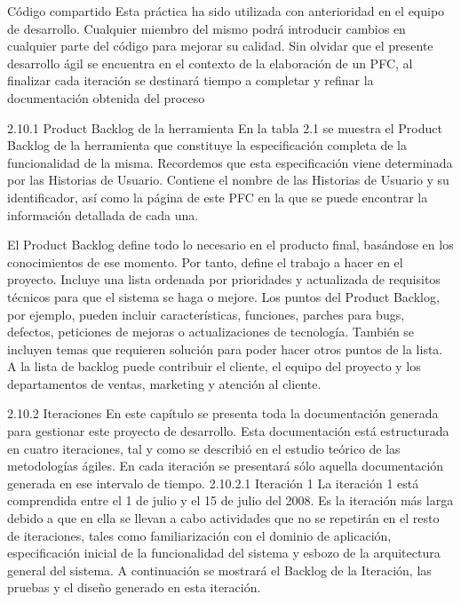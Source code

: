  Código compartido 
Esta práctica ha sido utilizada con anterioridad en el equipo de desarrollo. Cualquier miembro 
del mismo podrá introducir cambios en cualquier parte del código para mejorar su calidad. 
Sin olvidar que el presente desarrollo ágil se encuentra en el contexto de la elaboración de un 
PFC,  al  finalizar  cada  iteración  se  destinará  tiempo  a  completar  y  refinar  la  documentación 
obtenida del proceso

2.10.1 Product Backlog de la herramienta 
En  la  tabla  2.1  se  muestra  el  Product  Backlog  de  la  herramienta  que  constituye  la 
especificación completa de la funcionalidad de la misma. Recordemos que esta especificación 
viene determinada por las Historias de Usuario. 
Contiene el nombre de las Historias de Usuario y su identificador, así como la página de este 
PFC en la que se puede encontrar la información detallada de cada una.  

El Product Backlog define todo lo necesario en el producto final, basándose en los
conocimientos de ese momento. Por tanto, define el trabajo a hacer en el proyecto. Incluye
una lista ordenada por prioridades y actualizada de requisitos técnicos para que el sistema se
haga o mejore. Los puntos del Product Backlog, por ejemplo, pueden incluir características,
funciones, parches para bugs, defectos, peticiones de mejoras o actualizaciones de tecnología.
También se incluyen temas que requieren solución para poder hacer otros puntos de la lista. A
la lista de backlog puede contribuir el cliente, el equipo del proyecto y los departamentos de
ventas, marketing y atención al cliente.




2.10.2 Iteraciones 
En este capítulo se presenta toda la documentación generada para gestionar este 
proyecto de desarrollo.  Esta documentación está  estructurada en cuatro iteraciones, tal y 
como se describió en el estudio teórico de las metodologías ágiles.  
En cada iteración se presentará sólo aquella documentación generada en ese intervalo de 
tiempo.  
2.10.2.1 Iteración 1 
La  iteración  1  está  comprendida  entre  el  1  de  julio  y  el  15  de  julio  del  2008.  Es  la 
iteración más larga debido a que en ella se llevan a cabo actividades que no se repetirán en el 
resto  de  iteraciones,  tales  como  familiarización  con  el  dominio  de  aplicación,  especificación 
inicial de la funcionalidad del sistema y esbozo de la arquitectura general del sistema. 
A continuación se mostrará el Backlog de la Iteración, las pruebas y el diseño generado en esta 
iteración. 




